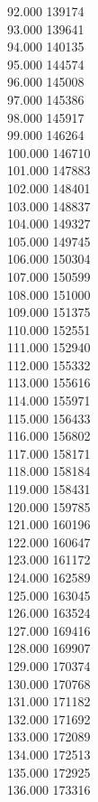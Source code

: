 { 92.000	139174 \\
 93.000	139641 \\
 94.000	140135 \\
 95.000	144574 \\
 96.000	145008 \\
 97.000	145386 \\
 98.000	145917 \\
 99.000	146264 \\
 100.000	146710 \\
 101.000	147883 \\
 102.000	148401 \\
 103.000	148837 \\
 104.000	149327 \\
 105.000	149745 \\
 106.000	150304 \\
 107.000	150599 \\
 108.000	151000 \\
 109.000	151375 \\
 110.000	152551 \\
 111.000	152940 \\
 112.000	155332 \\
 113.000	155616 \\
 114.000	155971 \\
 115.000	156433 \\
 116.000	156802 \\
 117.000	158171 \\
 118.000	158184 \\
 119.000	158431 \\
 120.000	159785 \\
 121.000	160196 \\
 122.000	160647 \\
 123.000	161172 \\
 124.000	162589 \\
 125.000	163045 \\
 126.000	163524 \\
 127.000	169416 \\
 128.000	169907 \\
 129.000	170374 \\
 130.000	170768 \\
 131.000	171182 \\
 132.000	171692 \\
 133.000	172089 \\
 134.000	172513 \\
 135.000	172925 \\
 136.000	173316 \\
}
